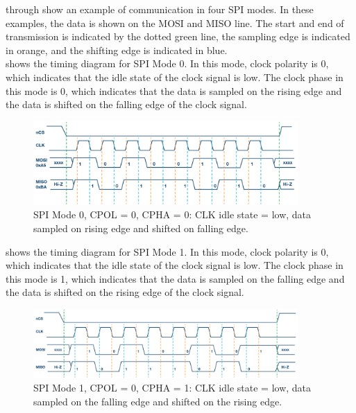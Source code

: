  through  show an example of communication in four SPI modes. In these examples, the data is shown on the MOSI and MISO line. The start and end of transmission is indicated by the dotted green line, the sampling edge is indicated in orange, and the shifting edge is indicated in blue.\\ 
 shows the timing diagram for SPI Mode 0. In this mode, clock polarity is 0, which indicates that the idle state of the clock signal is low. The clock phase in this mode is 0, which indicates that the data is sampled on the rising edge and the data is shifted on the falling edge of the clock signal.

\begin{figure}[H]
\begin{center}
    \includegraphics[width=0.9\textwidth]{images/SPIMode0.png} 
    \caption{SPI Mode 0, CPOL = 0, CPHA = 0: CLK idle state = low, data sampled on rising edge and shifted on falling edge.}
    \label{SPIMode0}
\end{center}
\end{figure}

 shows the timing diagram for SPI Mode 1. In this mode, clock polarity is 0, which indicates that the idle state of the clock signal is low. The clock phase in this mode is 1, which indicates that the data is sampled on the falling edge and the data is shifted on the rising edge of the clock signal.

\begin{figure}[H]
\begin{center}
    \includegraphics[width=0.9\textwidth]{images/SPIMode1.png} 
    \caption{SPI Mode 1, CPOL = 0, CPHA = 1: CLK idle state = low, data sampled on the falling edge and shifted on the rising edge.}
    \label{SPIMode1}
\end{center}
\end{figure}

